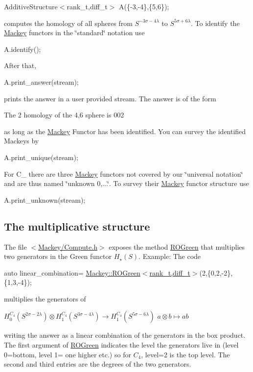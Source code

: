 {\ttfamily  Additive\+Structure$<$rank\+\_\+t,diff\+\_\+t$>$ A(\{-\/3,-\/4\},\{5,6\}); }

computes the homology of all spheres from $S^{-3\sigma-4\lambda}$ to $S^{5\sigma+6\lambda}$. To identify the \hyperlink{namespaceMackey}{Mackey} functors in the \char`\"{}standard\char`\"{} notation use

{\ttfamily  A.\+identify(); }

After that,

{\ttfamily  A.\+print\+\_\+answer(stream); }

prints the answer in a user provided {\ttfamily stream}. The answer is of the form

{\ttfamily  The 2 homology of the 4,6 sphere is 002 }

as long as the \hyperlink{namespaceMackey}{Mackey} Functor has been identified. You can survey the identified Mackeys by

{\ttfamily  A.\+print\+\_\+unique(stream); }

For {\ttfamily C\+\_} there are three \hyperlink{namespaceMackey}{Mackey} functors not covered by our \char`\"{}universal notation\char`\"{} and are thus named \char`\"{}unknown 0,...\char`\"{}. To survey their \hyperlink{namespaceMackey}{Mackey} functor structure use

{\ttfamily  A.\+print\+\_\+unknown(stream); }\hypertarget{use_step1mult}{}\subsection{The multiplicative structure}\label{use_step1mult}
The file {\ttfamily $<$\hyperlink{Compute_8h}{Mackey/\+Compute.\+h}$>$} exposes the method \hyperlink{namespaceMackey_a2bd86833844ca62d76c47a54aeb0bb77}{R\+O\+Green} that multiplies two generators in the Green functor $H_{\star}(S)$. Example\+: The code

{\ttfamily  auto linear\+\_\+combination= \hyperlink{namespaceMackey_a2bd86833844ca62d76c47a54aeb0bb77}{Mackey\+::\+R\+O\+Green$<$rank\+\_\+t,diff\+\_\+t$>$}(2,\{0,2,-\/2\},\{1,3,-\/4\}); }

multiplies the generators of

$ H_0^{C_4}(S^{2\sigma-2\lambda}) \otimes H_1^{C_4}(S^{3\sigma-4\lambda}) \to H_1^{C_4}(S^{5\sigma-6\lambda}) $ $ a\otimes b\mapsto ab$

writing the answer as a linear combination of the generators in the box product. The first argument of \hyperlink{namespaceMackey_a2bd86833844ca62d76c47a54aeb0bb77}{R\+O\+Green} indicates the level the generators live in (level 0=bottom, level 1= one higher etc.) so for $C_4$, level=2 is the top level. The second and third entries are the degrees of the two generators.

